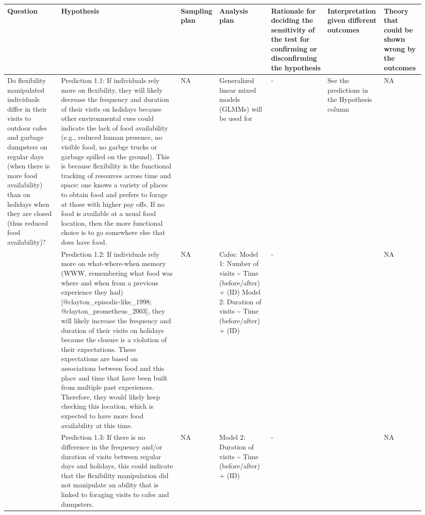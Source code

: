 \documentclass[
]{article}
\begin{document}
\begin{tabular}{l|l|l|l|l|l|l}
\hline
Question & Hypothesis & Sampling plan & Analysis plan & Rationale for deciding the sensitivity of the test for confirming or disconfirming the hypothesis & Interpretation given different outcomes & Theory that could be shown wrong by the outcomes\\
\hline
Do flexibility manipulated individuals differ in their visits to outdoor cafes and garbage dumpsters on regular days (when there is more food availability) than on holidays when they are closed (thus reduced food availability)? & Prediction 1.1: If individuals rely more on flexibility, they will likely decrease the frequency and duration of their visits on holidays because other environmental cues could indicate the lack of food availability (e.g., reduced human presence, no visible food, no garbge trucks or garbage spilled on the ground). This is because flexibility is the functional tracking of resources across time and space: one knows a variety of places to obtain food and prefers to forage at those with higher pay offs. If no food is available at a usual food location, then the more functional choice is to go somewhere else that does have food. & NA & Generalized linear mixed models (GLMMs) will be used for & - & See the predictions in the Hypothesis column & NA\\
\hline
 & Prediction 1.2: If individuals rely more on what-where-when memory (WWW, remembering what food was where and when from a previous experience they had) [@clayton\_episodic-like\_1998; @clayton\_prometheus\_2003], they will likely increase the frequency and duration of their visits on holidays because the closure is a violation of their expectations. These expectations are based on associations between food and this place and time that have been built from multiple past experiences. Therefore, they would likely keep checking this location, which is expected to have more food availability at this time. & NA & Cafes:
Model 1: Number of visits \textasciitilde{} Time (before/after) + (ID)
Model 2: Duration of visits \textasciitilde{} Time (before/after) + (ID) & - &  & NA\\
\hline
 & Prediction 1.3: If there is no difference in the frequency and/or duration of visits between regular days and holidays, this could indicate that the flexibility manipulation did not manipulate an ability that is linked to foraging visits to cafes and dumpsters. & NA & Model 2: Duration of visits \textasciitilde{} Time (before/after) + (ID) & - &  & NA\\

\end{tabular}
\end{document}
